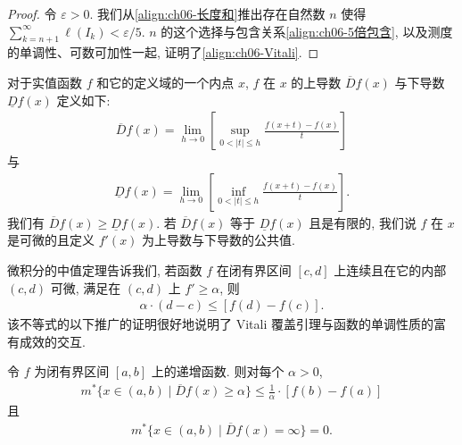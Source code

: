 \documentclass[../../main.tex]{subfiles}
\begin{document}
\begin{proof}
令 $\varepsilon>0$. 我们从\eqref{align:ch06-长度和}推出存在自然数 $n$ 使得 $\sum_{k=n+1}^{\infty}\ell(I_{k})<\varepsilon/5$. $n$ 的这个选择与包含关系\eqref{align:ch06-5倍包含}, 以及测度的单调性、可数可加性一起, 证明了\eqref{align:ch06-Vitali}.
\end{proof}

对于实值函数 $f$ 和它的定义域的一个内点 $x$, $f$ 在 $x$ 的上导数 $\overline{D}f(x)$ 与下导数 $\underline{D}f(x)$ 定义如下:
\begin{align*}
\overline{D}f(x)=\lim_{h\to 0}\left[\sup_{0<|t|\leqslant h}\frac{f(x+t)-f(x)}{t}\right]
\end{align*}
与
\begin{align*}
\underline{D}f(x)=\lim_{h\to 0}\left[\inf_{0<|t|\leqslant h}\frac{f(x+t)-f(x)}{t}\right].
\end{align*}
我们有 $\overline{D}f(x)\geqslant\underline{D}f(x)$. 若 $\overline{D}f(x)$ 等于 $\underline{D}f(x)$ 且是有限的, 我们说 $f$ 在 $x$ 是可微的且定义 $f'(x)$ 为上导数与下导数的公共值.

微积分的中值定理告诉我们, 若函数 $f$ 在闭有界区间 $[c,d]$ 上连续且在它的内部 $(c,d)$ 可微, 满足在 $(c,d)$ 上 $f'\geqslant\alpha$, 则
\begin{align*}
\alpha\cdot(d-c)\leqslant[f(d)-f(c)].
\end{align*}
该不等式的以下推广的证明很好地说明了 Vitali 覆盖引理与函数的单调性质的富有成效的交互.

\begin{lemma}\label{lemma:ch06-上导数估计}
令 $f$ 为闭有界区间 $[a,b]$ 上的递增函数. 则对每个 $\alpha>0$,
\begin{align}
m^{*}\{x\in(a,b)\mid\overline{D}f(x)\geqslant\alpha\}\leqslant\frac{1}{\alpha}\cdot[f(b)-f(a)]\label{align:ch06-上导数估计}
\end{align}
且
\begin{align}
m^{*}\{x\in(a,b)\mid\overline{D}f(x)=\infty\}=0.\label{align:ch06-上导数无穷}
\end{align}
\end{lemma}
\end{document}
